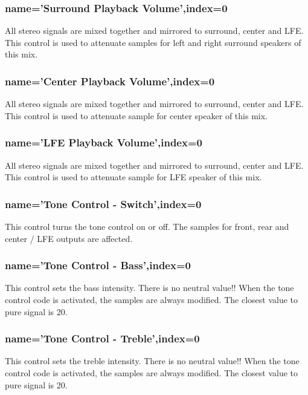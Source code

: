 \documentclass[a4paper,8pt,english]{sphinxmanual}
\begin{document}
\subsubsection{name='Surround Playback Volume',index=0}
\label{sound/cards/audigy-mixer:name-surround-playback-volume-index-0}
All stereo signals are mixed together and mirrored to surround, center and LFE.
This control is used to attenuate samples for left and right surround speakers of
this mix.


\subsubsection{name='Center Playback Volume',index=0}
\label{sound/cards/audigy-mixer:name-center-playback-volume-index-0}
All stereo signals are mixed together and mirrored to surround, center and LFE.
This control is used to attenuate sample for center speaker of this mix.


\subsubsection{name='LFE Playback Volume',index=0}
\label{sound/cards/audigy-mixer:name-lfe-playback-volume-index-0}
All stereo signals are mixed together and mirrored to surround, center and LFE.
This control is used to attenuate sample for LFE speaker of this mix.


\subsubsection{name='Tone Control - Switch',index=0}
\label{sound/cards/audigy-mixer:name-tone-control-switch-index-0}
This control turns the tone control on or off. The samples for front, rear
and center / LFE outputs are affected.


\subsubsection{name='Tone Control - Bass',index=0}
\label{sound/cards/audigy-mixer:name-tone-control-bass-index-0}
This control sets the bass intensity. There is no neutral value!!
When the tone control code is activated, the samples are always modified.
The closest value to pure signal is 20.


\subsubsection{name='Tone Control - Treble',index=0}
\label{sound/cards/audigy-mixer:name-tone-control-treble-index-0}
This control sets the treble intensity. There is no neutral value!!
When the tone control code is activated, the samples are always modified.
The closest value to pure signal is 20.
\end{document}
